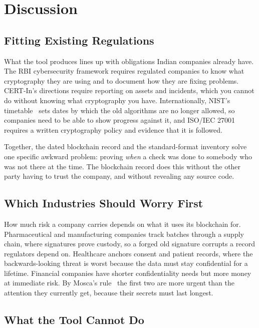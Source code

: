 \documentclass[runningheads]{llncs}
\begin{document}
\section{Discussion}
\label{sec:discussion}

\subsection{Fitting Existing Regulations}

What the tool produces lines up with obligations Indian companies already have.
The RBI cybersecurity framework requires regulated companies to know what
cryptography they are using and to document how they are fixing problems.
CERT-In's directions require reporting on assets and incidents, which you cannot
do without knowing what cryptography you have. Internationally, NIST's
timetable~\cite{nistir8547} sets dates by which the old algorithms are no longer
allowed, so companies need to be able to show progress against it, and ISO/IEC
27001 requires a written cryptography policy and evidence that it is followed.

Together, the dated blockchain record and the standard-format inventory solve
one specific awkward problem: proving \emph{when} a check was done to somebody
who was not there at the time. The blockchain record does this without the other
party having to trust the company, and without revealing any source code.

\subsection{Which Industries Should Worry First}

How much risk a company carries depends on what it uses its blockchain for.
Pharmaceutical and manufacturing companies track batches through a supply chain,
where signatures prove custody, so a forged old signature corrupts a record
regulators depend on. Healthcare anchors consent and patient records, where the
backwards-looking threat is worst because the data must stay confidential for a
lifetime. Financial companies have shorter confidentiality needs but more money
at immediate risk. By Mosca's rule~\cite{mosca2018} the first two are more
urgent than the attention they currently get, because their secrets must last
longest.

\subsection{What the Tool Cannot Do}
\label{sec:validity}
\end{document}
